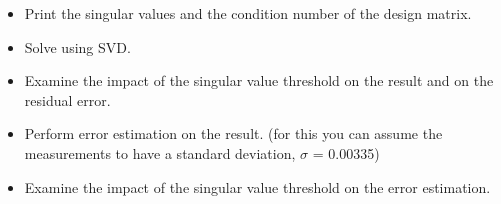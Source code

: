 \documentclass[../main.tex]{subfiles}
\begin{document}


\begin{itemize}
	\item  Print the singular values and the condition number of the design matrix.
	\item  Solve using SVD.
	\item  Examine the impact of the singular value threshold on the result and on the residual error.
	\item  Perform error estimation on the result. (for this you can assume the measurements to
		have a standard deviation, $\sigma$ = 0.00335)
	\item  Examine the impact of the singular value threshold on the error estimation.
\end{itemize}



	
\end{document}
